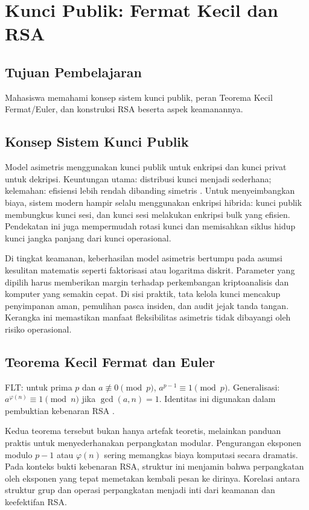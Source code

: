 \documentclass[../main.tex]{subfiles}
\begin{document}
\chapter{Kunci Publik: Fermat Kecil dan RSA}

\section{Tujuan Pembelajaran}
Mahasiswa memahami konsep sistem kunci publik, peran Teorema Kecil Fermat/Euler, dan konstruksi RSA beserta aspek keamanannya.

\section{Konsep Sistem Kunci Publik}
Model asimetris menggunakan kunci publik untuk enkripsi dan kunci privat untuk dekripsi. Keuntungan utama: distribusi kunci menjadi sederhana; kelemahan: efisiensi lebih rendah dibanding simetris \citep{katzlindell}. Untuk menyeimbangkan biaya, sistem modern hampir selalu menggunakan enkripsi hibrida: kunci publik membungkus kunci sesi, dan kunci sesi melakukan enkripsi bulk yang efisien. Pendekatan ini juga mempermudah rotasi kunci dan memisahkan siklus hidup kunci jangka panjang dari kunci operasional.

Di tingkat keamanan, keberhasilan model asimetris bertumpu pada asumsi kesulitan matematis seperti faktorisasi atau logaritma diskrit. Parameter yang dipilih harus memberikan margin terhadap perkembangan kriptoanalisis dan komputer yang semakin cepat. Di sisi praktik, tata kelola kunci mencakup penyimpanan aman, pemulihan pasca insiden, dan audit jejak tanda tangan. Kerangka ini memastikan manfaat fleksibilitas asimetris tidak dibayangi oleh risiko operasional.

\section{Teorema Kecil Fermat dan Euler}
FLT: untuk prima \(p\) dan \(a\not\equiv 0\pmod p\), \(a^{p-1}\equiv 1\pmod p\). Generalisasi: \(a^{\varphi(n)}\equiv 1\pmod n\) jika \(\gcd(a,n)=1\). Identitas ini digunakan dalam pembuktian kebenaran RSA \citep{hoffstein,rosen}.

Kedua teorema tersebut bukan hanya artefak teoretis, melainkan panduan praktis untuk menyederhanakan perpangkatan modular. Pengurangan eksponen modulo \(p-1\) atau \(\varphi(n)\) sering memangkas biaya komputasi secara dramatis. Pada konteks bukti kebenaran RSA, struktur ini menjamin bahwa perpangkatan oleh eksponen yang tepat memetakan kembali pesan ke dirinya. Korelasi antara struktur grup dan operasi perpangkatan menjadi inti dari keamanan dan keefektifan RSA.
\end{document}
